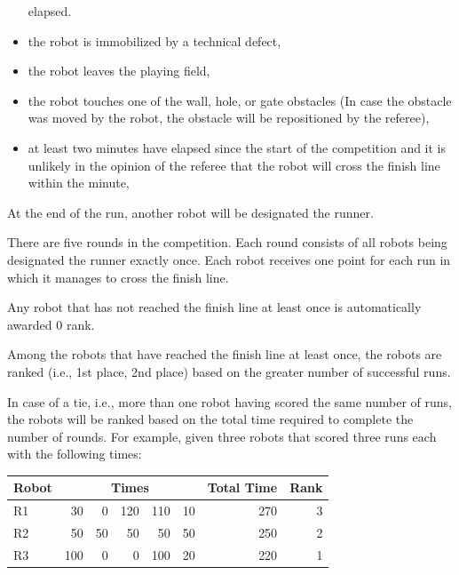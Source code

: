 \documentclass[12pt]{hurocup}
\begin{document}
\begin{lawlist}[OR]
\begin{itemize}
    elapsed. 
  \item the robot is immobilized by a technical defect,
  \item the robot leaves the playing field,
  \item the robot touches one of the wall, hole, or gate obstacles (In
    case the obstacle was moved by the robot, the obstacle will be
    repositioned by the referee),
  \item at least two minutes have elapsed since the start of the
    competition and it is unlikely in the opinion of the referee that
    the robot will cross the finish line within the minute,
  \end{itemize}
\end{lawlist}


\begin{lawlist}[OR]
\item At the end of the run, another robot will be designated the
  runner.
\item There are five rounds in the competition. Each round consists of
  all robots being designated the runner exactly once. Each robot
  receives one point for each run in which it manages to cross the
  finish line.
\item Any robot that has not reached the finish line at least once is automatically
  awarded 0 rank.

\item Among the robots that have reached the finish line at least
  once, the robots are ranked (i.e., 1st place, 2nd place) based on
  the greater number of successful runs.

\item In case of a tie, i.e., more than one robot having scored the
  same number of runs, the robots will be ranked based on the total
  time required to complete the number of rounds. For example, given
  three robots that scored three runs each with the following times:

      \begin{center}
        \begin{tabular}{l|rrrrr|r|r|}
          \hline
          Robot & \multicolumn{5}{c}{Times} & Total Time & Rank \\
          \hline
          R1 & 30 & 0 & 120 & 110 & 10 & 270 & 3 \\
          R2 & 50 & 50 & 50 & 50 & 50 & 250 & 2 \\
          R3 & 100 & 0 & 0 & 100 & 20 & 220 & 1 \\
          \hline
        \end{tabular}
      \end{center}


\end{lawlist}
\end{document}
